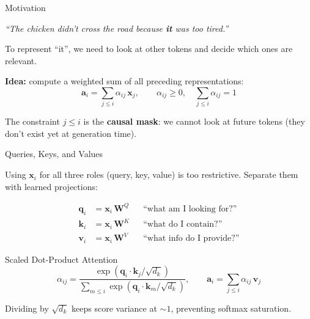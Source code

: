 \documentclass[aspectratio=169, professionalfonts]{beamer}
\begin{document}
\begin{frame}{Motivation}

\emph{``The chicken didn't cross the road because \textbf{it} was too
tired.''}

\bigskip

To represent ``it'', we need to look at other tokens and decide
which ones are relevant.

\bigskip

\textbf{Idea:} compute a weighted sum of all preceding representations:
$$\mathbf{a}_i = \sum_{j \le i} \alpha_{ij}\,\mathbf{x}_j,
  \qquad \alpha_{ij} \ge 0,
  \quad \sum_{j \le i}\alpha_{ij} = 1$$

The constraint $j \le i$ is the \textbf{causal mask}: we cannot look
at future tokens (they don't exist yet at generation time).

\end{frame}

\begin{frame}{Queries, Keys, and Values}

Using $\mathbf{x}_i$ for all three roles (query, key, value) is
too restrictive. Separate them with learned projections:

\begin{align*}
\mathbf{q}_i &= \mathbf{x}_i\,\mathbf{W}^Q
  &&\text{``what am I looking for?''} \\
\mathbf{k}_i &= \mathbf{x}_i\,\mathbf{W}^K
  &&\text{``what do I contain?''} \\
\mathbf{v}_i &= \mathbf{x}_i\,\mathbf{W}^V
  &&\text{``what info do I provide?''}
\end{align*}

\begin{block}{Scaled Dot-Product Attention}
\vspace{-6pt}
$$\alpha_{ij}
  = \frac{\exp(\mathbf{q}_i \cdot \mathbf{k}_j / \sqrt{d_k})}
         {\sum_{m \le i}\exp(\mathbf{q}_i \cdot \mathbf{k}_m / \sqrt{d_k})},
  \qquad
  \mathbf{a}_i = \sum_{j \le i}\alpha_{ij}\,\mathbf{v}_j$$
\vspace{-6pt}
\end{block}

\smallskip

Dividing by $\sqrt{d_k}$ keeps score variance at $\sim\!1$,
preventing softmax saturation.

\end{frame}
\end{document}
